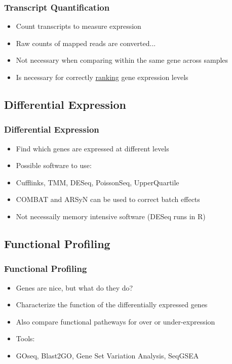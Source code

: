 \documentclass[14pt]{beamer}
\begin{document}
\begin{frame}
\frametitle{Transcript Quantification}
\begin{itemize}
	\item<1-> Count transcripts to measure expression
	\item<2-> Raw counts of mapped reads are converted...
	\item<4-> Not necessary when comparing within the same gene across samples
	\item<5-> Is necessary for correctly \underline{ranking} gene expression levels
\end{itemize}
\end{frame}

\subsection{Differential Expression}

\begin{frame}
\frametitle{Differential Expression}
\begin{itemize}
	\item<1-> Find which genes are expressed at different levels
	\item<2-> Possible software to use:
	\item<3-> Cufflinks, TMM, DESeq, PoissonSeq, UpperQuartile
	\item<4-> COMBAT and ARSyN can be used to correct batch effects
	\item<5-> Not necessaily memory intensive software (DESeq runs in R)
\end{itemize}
\end{frame}

\subsection{Functional Profiling}

\begin{frame}
\frametitle{Functional Profiling}
\begin{itemize}
	\item<1-> Genes are nice, but what do they do?
	\item<2-> Characterize the function of the differentially expressed genes
	\item<3-> Also compare functional patheways for over or under-expression
	\item<4-> Tools:
	\item<5-> GOseq, Blast2GO, Gene Set Variation Analysis, SeqGSEA
\end{itemize}
\end{frame}
\end{document}
